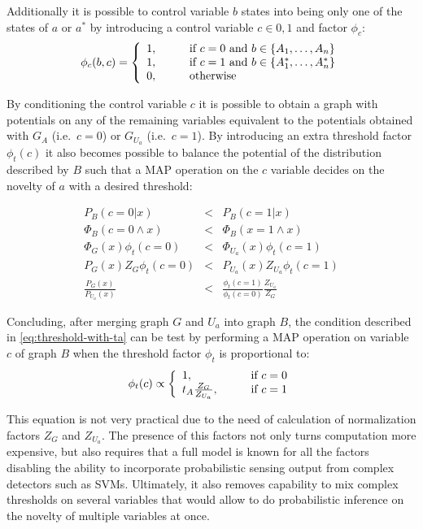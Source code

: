 Additionally it is possible to control variable $b$ states into being only one
of the states of $a$ or $a^*$ by introducing a control variable $c \in {0, 1}$
and factor $\phi_{c}$:
\[
\phi_{c}(b, c) = \left\{
  \begin{array}{l l}
    1, & \qquad \text{if } c = 0 \text{ and } b \in \{A_1,\dotsc,A_n\} \\
    1, & \qquad \text{if } c = 1 \text{ and } b \in \{A^*_1,\dotsc,A^*_n\}\\
    0, & \qquad \text{otherwise}
  \end{array} \right.
\]

By conditioning the control variable $c$ it is possible to obtain a graph with
potentials on any of the remaining variables equivalent to the potentials
obtained with $G_A$ (i.e.\ $c=0$) or $G_{U_a}$ (i.e.\ $c=1$). By introducing
an extra threshold factor $\phi_t(c)$ it also becomes possible to balance the
potential of the distribution described by $B$ such that a \gls{MAP} operation
on the $c$ variable decides on the novelty of $a$ with a desired threshold:

\begin{eqnarray*}
 P_B(c=0 | x)         &<& P_B(c=1 | x) \\
\Phi_B(c=0 \land x)   &<& \Phi_B(x=1 \land x) \\
\Phi_G(x) \phi_t(c=0) &<& \Phi_{U_a}(x) \phi_t(c=1) \\
P_G(x) Z_G \phi_t(c=0) &<& P_{U_a}(x) Z_{U_a} \phi_t(c=1) \\
\frac{P_G(x)}{P_{U_a}(x)} &<& \frac{\phi_t(c=1)}{\phi_t(c=0)}\frac{Z_{U_a}}{Z_G}
\end{eqnarray*}

Concluding, after merging graph $G$ and $U_a$ into graph $B$, the condition
described in \autoref{eq:threshold-with-ta} can be test by performing a
\gls{MAP} operation on variable $c$ of graph $B$ when the threshold factor
$\phi_t$ is proportional to:
\begin{equation}
\label{eq:structure-ratio}
\phi_t(c) \propto \left\{
  \begin{array}{l l}
    1, & \qquad \text{if } c = 0 \\
    t_A \frac{Z_G}{Z_{U_a}}, & \qquad \text{if } c = 1\\
  \end{array} \right.
\end{equation}

This equation is not very practical due to the need of calculation of
normalization factors $Z_G$ and $Z_{U_a}$. The presence of this factors
not only turns computation more expensive, but also requires that a full model
is known for all the factors disabling the ability to incorporate probabilistic
sensing output from complex detectors such as \glspl{SVM}. Ultimately, it also
removes capability to mix complex thresholds on several variables that would
allow to do probabilistic inference on the novelty of multiple variables at once.

